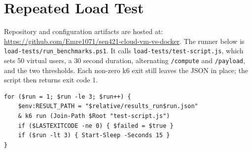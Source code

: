 \documentclass[conference,a4paper]{IEEEtran}
\begin{document}
\appendix

\section{Repeated Load Test}
\label{app:code}

Repository and configuration artifacts are hosted at: \url{https://github.com/Emre1071/sen421-cloud-vm-vs-docker}. The runner below is \texttt{load-tests/run\_benchmarks.ps1}. It calls \texttt{load-tests/test-script.js}, which sets 50 virtual users, a 30 second duration, alternating \texttt{/compute} and \texttt{/payload}, and the two thresholds. Each non-zero k6 exit still leaves the JSON in place; the script then returns exit code 1.

\begin{lstlisting}[caption={Repeated k6 runs used for both targets}, label={lst:runs}]
for ($run = 1; $run -le 3; $run++) {
    $env:RESULT_PATH = "$relative/results_run$run.json"
    & k6 run (Join-Path $Root "test-script.js")
    if ($LASTEXITCODE -ne 0) { $failed = $true }
    if ($run -lt 3) { Start-Sleep -Seconds 15 }
}
\end{lstlisting}
\end{document}
